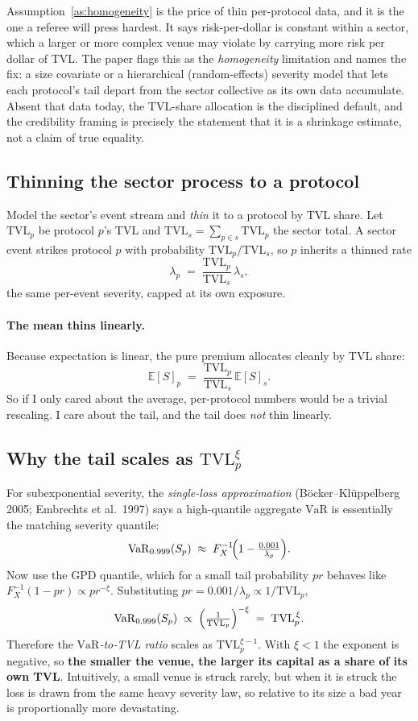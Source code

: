\documentclass[11pt]{article}
\theoremstyle{definition}
\theoremstyle{remark}
\theoremstyle{definition}
\newcommand{\E}{\mathbb{E}}
\newcommand{\VaR}{\mathrm{VaR}}
\newcommand{\TVL}{\mathrm{TVL}}
\newcommand{\1}{\mathbf{1}}
\begin{document}
\noindent Assumption~\ref{as:homogeneity} is the price of thin per-protocol data,
and it is the one a referee will press hardest. It says risk-per-dollar is
constant within a sector, which a larger or more complex venue may violate by
carrying more risk per dollar of TVL. The paper flags this as the
\emph{homogeneity} limitation and names the fix: a size covariate or a
hierarchical (random-effects) severity model that lets each protocol's tail
depart from the sector collective as its own data accumulate. Absent that data
today, the TVL-share allocation is the disciplined default, and the credibility
framing is precisely the statement that it is a shrinkage estimate, not a claim
of true equality.

\subsection{Thinning the sector process to a protocol}

Model the sector's event stream and \emph{thin} it to a protocol by TVL share.
Let $\TVL_p$ be protocol $p$'s TVL and $\TVL_s=\sum_{p\in s}\TVL_p$ the sector
total. A sector event strikes protocol $p$ with probability $\TVL_p/\TVL_s$, so
$p$ inherits a thinned rate
\[
\lambda_p \;=\; \frac{\TVL_p}{\TVL_s}\,\lambda_s,
\]
the same per-event severity, capped at its own exposure.

\paragraph{The mean thins linearly.}
Because expectation is linear, the pure premium allocates cleanly by TVL share:
\[
\E[S]_p \;=\; \frac{\TVL_p}{\TVL_s}\,\E[S]_s.
\]
So if I only cared about the average, per-protocol numbers would be a trivial
rescaling. I care about the tail, and the tail does \emph{not} thin linearly.

\subsection{Why the tail scales as $\TVL_p^{\xi}$}\label{sec:tvlscaling}

For subexponential severity, the \emph{single-loss approximation}
(B\"ocker--Kl\"uppelberg 2005; Embrechts et al.\ 1997) says a high-quantile
aggregate $\VaR$ is essentially the matching severity quantile:
\begin{equation}\label{eq:sla}
\VaR_{0.999}(S_p) \;\approx\; F_X^{-1}\!\Bigl(1-\tfrac{0.001}{\lambda_p}\Bigr).
\end{equation}
Now use the GPD quantile, which for a small tail probability $pr$ behaves like
$F_X^{-1}(1-pr)\propto pr^{-\xi}$. Substituting $pr=0.001/\lambda_p\propto
1/\TVL_p$,
\[
\VaR_{0.999}(S_p) \;\propto\; \Bigl(\tfrac{1}{\TVL_p}\Bigr)^{-\xi}
\;=\; \TVL_p^{\,\xi}.
\]
Therefore the \emph{$\VaR$-to-TVL ratio} scales as $\TVL_p^{\xi-1}$. With
$\xi<1$ the exponent is negative, so \textbf{the smaller the venue, the larger
its capital as a share of its own TVL}. Intuitively, a small venue is struck
rarely, but when it is struck the loss is drawn from the same heavy severity
law, so relative to its size a bad year is proportionally more devastating.
\end{document}
